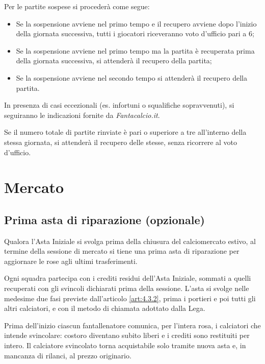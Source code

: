 Per le partite sospese si procederà come segue:

\begin{itemize}
    \item Se la sospensione avviene nel primo tempo e il recupero avviene dopo l'inizio della giornata successiva, tutti i giocatori riceveranno voto d'ufficio pari a 6;
    \item Se la sospensione avviene nel primo tempo ma la partita è recuperata prima della giornata successiva, si attenderà il recupero della partita;
    \item Se la sospensione avviene nel secondo tempo si attenderà il recupero della partita.
\end{itemize}

In presenza di casi eccezionali (es. infortuni o squalifiche sopravvenuti), si seguiranno le indicazioni fornite da \emph{Fantacalcio.it}.

Se il numero totale di partite rinviate è pari o superiore a tre all'interno della stessa giornata, si attenderà il recupero delle stesse, senza ricorrere al voto d'ufficio.


\chapter{Mercato}
\label{cap:mercato}

\section{Prima asta di riparazione (opzionale)}
\label{art:6.1}

Qualora l'Asta Iniziale si svolga prima della chiusura del calciomercato estivo, al termine della sessione di mercato si tiene una prima asta di riparazione per aggiornare le rose agli ultimi trasferimenti.

Ogni squadra partecipa con i crediti residui dell'Asta Iniziale, sommati a quelli recuperati con gli svincoli dichiarati prima della sessione. L'asta si svolge nelle medesime due fasi previste dall'articolo \ref{art:4.3.2}, prima i portieri e poi tutti gli altri calciatori, e con il metodo di chiamata adottato dalla Lega.

Prima dell'inizio ciascun fantallenatore comunica, per l'intera rosa, i calciatori che intende svincolare: costoro diventano subito liberi e i crediti sono restituiti per intero. Il calciatore svincolato torna acquistabile solo tramite nuova asta e, in mancanza di rilanci, al prezzo originario.

